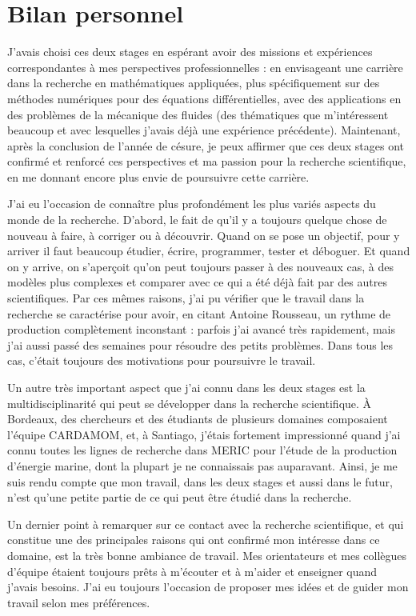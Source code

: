 \part*{Bilan personnel}

\indent J'avais choisi ces deux stages en espérant avoir des missions et expériences correspondantes à mes perspectives professionnelles : en envisageant une carrière dans la recherche en mathématiques appliquées, plus spécifiquement sur des méthodes numériques pour des équations différentielles, avec des applications en des problèmes de la mécanique des fluides (des thématiques que m'intéressent beaucoup et avec lesquelles j'avais déjà une expérience précédente). Maintenant, après la conclusion de l'année de césure, je peux affirmer que ces deux stages ont confirmé et renforcé ces perspectives et ma passion pour la recherche scientifique, en me donnant encore plus envie de poursuivre cette carrière.

\indent J'ai eu l'occasion de connaître plus profondément les plus variés aspects du monde de la recherche. D'abord, le fait de qu'il y a toujours quelque chose de nouveau à faire, à corriger ou à découvrir. Quand on se pose un objectif, pour y arriver il faut beaucoup étudier, écrire, programmer, tester et déboguer. Et quand on y arrive, on s'aperçoit qu'on peut toujours passer à des nouveaux cas, à des modèles plus complexes et comparer avec ce qui a été déjà fait par des autres scientifiques. Par ces mêmes raisons, j'ai pu vérifier que le travail dans la recherche se caractérise pour avoir, en citant Antoine Rousseau, un rythme de production complètement inconstant : parfois j'ai avancé très rapidement, mais j'ai aussi passé des semaines pour résoudre des petits problèmes. Dans tous les cas, c'était toujours des motivations pour poursuivre le travail.

\indent Un autre très important aspect que j'ai connu dans les deux stages est la multidisciplinarité qui peut se développer dans la recherche scientifique. À Bordeaux, des chercheurs et des étudiants de plusieurs domaines composaient l'équipe CARDAMOM, et, à Santiago, j'étais fortement impressionné quand j'ai connu toutes les lignes de recherche dans MERIC pour l'étude de la production d'énergie marine, dont la plupart je ne connaissais pas auparavant. Ainsi, je me suis rendu compte que mon travail, dans les deux stages et aussi dans le futur, n'est qu'une petite partie de ce qui peut être étudié dans la recherche.

\indent Un dernier point à remarquer sur ce contact avec la recherche scientifique, et qui constitue une des principales raisons qui ont confirmé mon intéresse dans ce domaine, est la très bonne ambiance de travail. Mes orientateurs et mes collègues d'équipe étaient toujours prêts à m'écouter et à m'aider et enseigner quand j'avais besoins. J'ai eu toujours l'occasion de proposer mes idées et de guider mon travail selon mes préférences.

